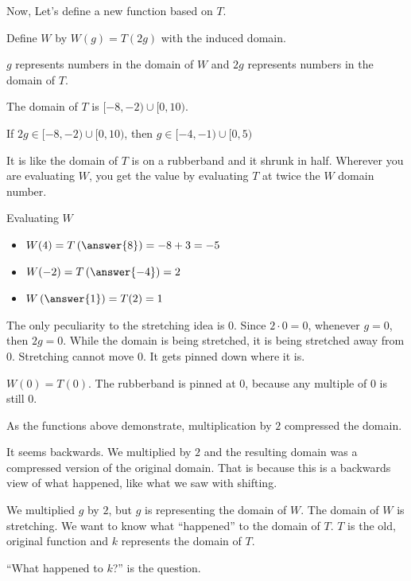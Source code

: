 \documentclass{ximera}
\begin{document}
Now, Let's define a new function based on $T$.



Define $W$ by $W(g) = T(2g)$ with the induced domain.



$g$ represents numbers in the domain of $W$ and $2g$ represents numbers in the domain of $T$.  

The domain of $T$ is $[-8,-2) \cup [0,10)$.


If $2g \in [-8,-2) \cup [0,10)$, then $g \in [-4,-1) \cup [0,5)$

It is like the domain of $T$ is on a rubberband and it shrunk in half. Wherever you are evaluating $W$, you get the value by evaluating $T$ at twice the $W$ domain number.



\begin{example}  Evaluating $W$

\begin{itemize}
\item $W(4) = T\left(\answer{8}\right) = -8+3=-5$
\item $W(-2) = T\left(\answer{-4}\right) = 2$
\item $W\left(\answer{1}\right) = T(2) = 1$
\end{itemize}


\end{example}


The only peculiarity to the stretching idea is $0$.  Since $2 \cdot 0 = 0$, whenever $g = 0$, then $2g = 0$.  While the domain is being stretched, it is being stretched away from $0$. Stretching cannot move $0$. It gets pinned down where it is.


$W(0) = T(0)$.  The rubberband is pinned at $0$, because any multiple of $0$ is still $0$.  

As the functions above demonstrate, multiplication by $2$ compressed the domain.

It seems backwards.  We multiplied by $2$ and the resulting domain was a compressed version of the original domain.  That is because this is a backwards view of what happened, like what we saw with shifting.



We multiplied $g$ by $2$, but $g$ is representing the domain of $W$.  The domain of $W$ is stretching.  We want to know what ``happened'' to the domain of $T$.  $T$ is the old, original function and $k$ represents the domain of $T$.  

``What happened to $k$?'' is the question.
\end{document}
